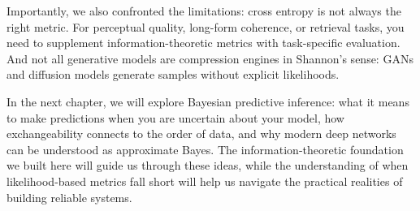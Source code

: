 Importantly, we also confronted the limitations: cross entropy is not always the right metric. For perceptual quality, long-form coherence, or retrieval tasks, you need to supplement information-theoretic metrics with task-specific evaluation. And not all generative models are compression engines in Shannon's sense: GANs and diffusion models generate samples without explicit likelihoods.

In the next chapter, we will explore Bayesian predictive inference: what it means to make predictions when you are uncertain about your model, how exchangeability connects to the order of data, and why modern deep networks can be understood as approximate Bayes. The information-theoretic foundation we built here will guide us through these ideas, while the understanding of when likelihood-based metrics fall short will help us navigate the practical realities of building reliable systems.
